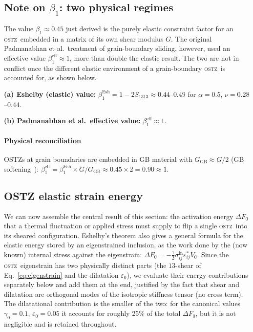 \documentclass[3p]{elsarticle}
\newcommand{\OSTZ}{\textsc{ostz}}
\newcommand{\dF}{\Delta F_0}
\newcommand{\gz}{\gamma_0}
\newcommand{\half}{\tfrac{1}{2}}
\begin{document}
\subsection{Note on $\beta_1$: two physical regimes}

The value $\beta_1\approx0.45$ just derived is the purely elastic
constraint factor for an \OSTZ\ embedded in a matrix of its own
shear modulus $G$. The original Padmanabhan et al.\ treatment of
grain-boundary sliding, however, used an effective value
$\beta_1^\text{eff}\approx1$, more than double the elastic result.
The two are not in conflict once the different elastic environment
of a grain-boundary \OSTZ\ is accounted for, as shown below.

\textbf{(a) Eshelby (elastic) value:}
$\beta_1^\text{Esh}=1-2S_{1313}\approx0.44$--$0.49$
for $\alpha=0.5$, $\nu=0.28$--$0.44$.

\textbf{(b) Padmanabhan et al.\ effective value:} $\beta_1^\text{eff}\approx1$.

\paragraph{Physical reconciliation} OSTZs at grain boundaries are embedded
in GB material with $G_\text{GB}\approx G/2$ (GB softening~\citep{wolf1990}):
$\beta_1^\text{eff}=\beta_1^\text{Esh}\times G/G_\text{GB}
\approx0.45\times2=0.90\approx1$.

\subsection{OSTZ elastic strain energy}
\label{sec:energy}

We can now assemble the central result of this section: the
activation energy $\dF$ that a thermal fluctuation or applied stress
must supply to flip a single \OSTZ\ into its sheared configuration.
Eshelby's theorem also gives a general formula for the elastic
energy stored by an eigenstrained inclusion, as the work done by the
(now known) internal stress against the eigenstrain:
$\dF=-\half\sigma_{ij}^\mathrm{in}\varepsilon^*_{ij}V_0$. Since the
\OSTZ\ eigenstrain has two physically distinct parts (the
$13$-shear of Eq.~\eqref{eq:eigenstrain} and the dilatation
$\varepsilon_0$), we evaluate their energy contributions
separately below and add them at the end, justified by the fact
that shear and dilatation are orthogonal modes of the isotropic
stiffness tensor (no cross term). The dilatational contribution is
the smaller of the two: for the canonical values $\gz=0.1$,
$\varepsilon_0=0.05$ it accounts for roughly 25\% of the total
$\dF$, but it is not negligible and is retained throughout.
\end{document}

